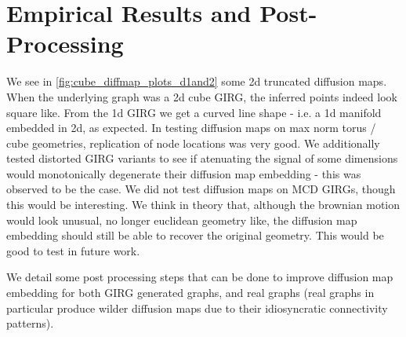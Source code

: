 \section{Empirical Results and Post-Processing}
\label{sec:diffusion_maps_empirical_results}
We see in \cref{fig:cube_diffmap_plots_d1and2} some 2d truncated diffusion maps. When the underlying graph was a 2d cube GIRG, the inferred points indeed look square like. From the 1d GIRG we get a curved line shape - i.e. a 1d manifold embedded in 2d, as expected. In testing diffusion maps on max norm torus / cube geometries, replication of node locations was very good. We additionally tested distorted GIRG variants to see if atenuating the signal of some dimensions would monotonically degenerate their diffusion map embedding - this was observed to be the case. We did not test diffusion maps on MCD GIRGs, though this would be interesting. We think in theory that, although the brownian motion would look unusual, no longer euclidean geometry like, the diffusion map embedding should still be able to recover the original geometry. This would be good to test in future work. 

We detail some post processing steps that can be done to improve diffusion map embedding for both GIRG generated graphs, and real graphs (real graphs in particular produce wilder diffusion maps due to their idiosyncratic connectivity patterns).


